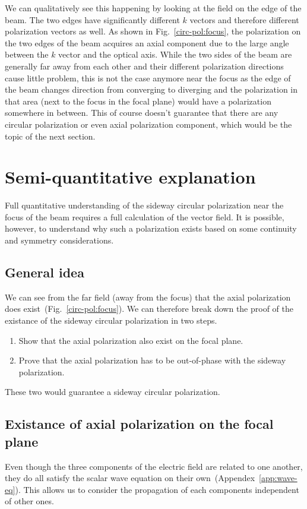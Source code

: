 \documentclass[10pt,fleqn]{article}
\begin{document}
We can qualitatively see this happening by looking at the field
on the edge of the beam.
The two edges have significantly different $k$ vectors
and therefore different polarization vectors as well.
As shown in Fig.~\ref{circ-pol:focus}, the polarization on the two edges of the beam
acquires an axial component due to the large angle between the $k$ vector
and the optical axis. While the two sides of the beam are generally
far away from each other and their different polarization directions cause
little problem, this is not the case anymore near the focus as the edge of the beam
changes direction from converging to diverging and the polarization in that area
(next to the focus in the focal plane) would have a polarization somewhere in between.
This of course doesn't guarantee that there are any circular polarization
or even axial polarization component, which would be the topic of the next section.

\section{Semi-quantitative explanation}

Full quantitative understanding of the sideway circular polarization
near the focus of the beam requires a full calculation of the vector field.
It is possible, however, to understand why such a polarization exists
based on some continuity and symmetry considerations.

\subsection{General idea}
We can see from the far field (away from the focus)
that the axial polarization does exist~(Fig.~\ref{circ-pol:focus}).
We can therefore break down the proof of the existance of
the sideway circular polarization in two steps.
\begin{enumerate}
\item Show that the axial polarization also exist on the focal plane.
\item Prove that the axial polarization has to be out-of-phase
  with the sideway polarization.
\end{enumerate}
These two would guarantee a sideway circular polarization.

\subsection{Existance of axial polarization on the focal plane}
Even though the three components of the electric field are related to one another,
they do all satisfy the scalar wave equation on their own~(Appendex~\ref{app:wave-eq}).
This allows us to consider the propagation of each components independent of other ones.
\end{document}
